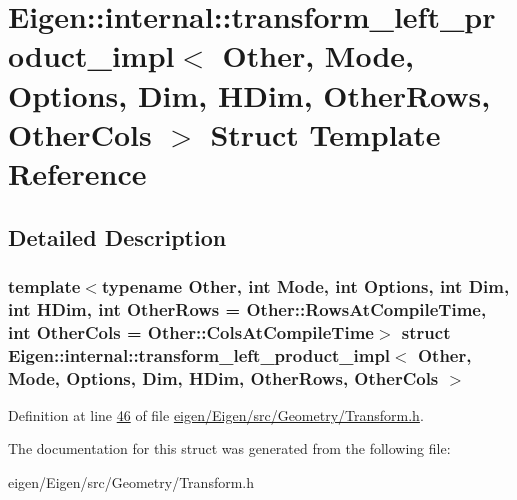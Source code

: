 \hypertarget{struct_eigen_1_1internal_1_1transform__left__product__impl}{}\section{Eigen\+:\+:internal\+:\+:transform\+\_\+left\+\_\+product\+\_\+impl$<$ Other, Mode, Options, Dim, H\+Dim, Other\+Rows, Other\+Cols $>$ Struct Template Reference}
\label{struct_eigen_1_1internal_1_1transform__left__product__impl}


\subsection{Detailed Description}
\subsubsection*{template$<$typename Other, int Mode, int Options, int Dim, int H\+Dim, int Other\+Rows = Other\+::\+Rows\+At\+Compile\+Time, int Other\+Cols = Other\+::\+Cols\+At\+Compile\+Time$>$\newline
struct Eigen\+::internal\+::transform\+\_\+left\+\_\+product\+\_\+impl$<$ Other, Mode, Options, Dim, H\+Dim, Other\+Rows, Other\+Cols $>$}



Definition at line \hyperlink{eigen_2_eigen_2src_2_geometry_2_transform_8h_source_l00046}{46} of file \hyperlink{eigen_2_eigen_2src_2_geometry_2_transform_8h_source}{eigen/\+Eigen/src/\+Geometry/\+Transform.\+h}.



The documentation for this struct was generated from the following file\+:\begin{DoxyCompactItemize}
\item 
eigen/\+Eigen/src/\+Geometry/\+Transform.\+h\end{DoxyCompactItemize}
